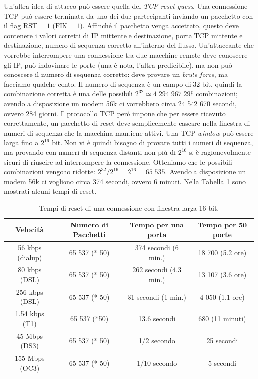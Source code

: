 Un'altra idea di attacco può essere quella del \textit{TCP reset guess}. Una connessione TCP può essere terminata da uno dei due partecipanti inviando un pacchetto con il flag $\text{RST}=1$ ($\text{FIN}=1$). Affinché il pacchetto venga accettato, questo deve contenere i valori corretti di IP mittente e destinazione, porta TCP mittente e destinazione, numero di sequenza corretto all'interno del flusso. Un'attaccante che vorrebbe interrompere una connessione tra due macchine remote deve conoscere gli IP, può indovinare le porte (una è nota, l'altra predicibile), ma non può conoscere il numero di sequenza corretto: deve provare un \textit{brute force}, ma facciamo qualche conto. Il numero di sequenza è un campo di 32 bit, quindi la combinazione corretta è una delle possibili $2^{32} \simeq 4\;294\;967\;295$ combinazioni; avendo a disposizione un modem 56k ci vorrebbero circa 24 542 670 secondi, ovvero 284 giorni. Il protocollo TCP però impone che per essere ricevuto correttamente, un pacchetto di reset deve semplicemente cascare nella finestra di numeri di sequenza che la macchina mantiene attivi. Una TCP \textit{window} può essere larga fino a $2^{16}$ bit. Non vi è quindi bisogno di provare tutti i numeri di sequenza, ma provando con numeri di sequenza distanti non più di $2^{16}$ si è ragionevolmente sicuri di riuscire ad interrompere la connessione. Otteniamo che le possibili combinazioni vengono ridotte: $2^{32}/2^{16} = 2^{16} = 65\;535$. Avendo a disposizione un modem 56k ci vogliono circa 374 secondi, ovvero 6 minuti. Nella Tabella \ref{tab:TCP-reset-guess} sono mostrati alcuni tempi di reset.
\begin{table}[t!]
	\centering
	\begin{tabular}{cccc}
		\toprule[0.5ex]
		\textbf{Velocità} & \textbf{Numero di Pacchetti} & \textbf{Tempo per una porta} & \textbf{Tempo per 50 porte}\\
		\midrule
		56 kbps (dialup) & 65 537 (* 50) & 374 secondi (6 min.) & 18 700 (5.2 ore)\\
		80 kbps (DSL) & 65 537 (* 50) & 262 secondi (4.3 min.) & 13 107 (3.6 ore)\\
		256 kbps (DSL) & 65 537 (* 50) & 81 secondi (1 min.) & 4 050 (1.1 ore)\\
		1.54 kbps (T1) & 65 537 (*50) & 13.6 secondi & 680 (11 minuti)\\
		45 Mbps (DS3) & 65 537 (* 50) & 1/2 secondo & 25 secondi\\
		155 Mbps (OC3) & 65 537 (* 50) & 1/10 secondo & 5 secondi\\
		\bottomrule[0.5ex]
	\end{tabular}
	\caption{Tempi di reset di una connessione con finestra larga 16 bit.}
	\label{tab:TCP-reset-guess}
\end{table}

